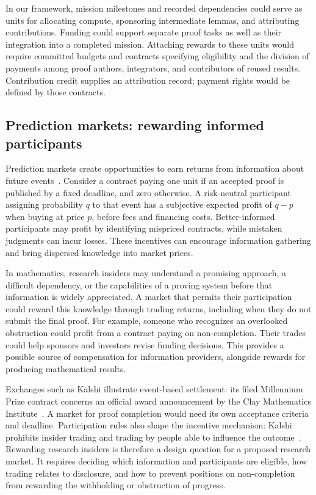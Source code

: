 \documentclass[11pt,a4paper,reqno]{amsart}
\numberwithin{equation}{section}
\begin{document}
In our framework, mission milestones and recorded dependencies could serve as units for allocating compute, sponsoring intermediate lemmas, and attributing contributions. Funding could support separate proof tasks as well as their integration into a completed mission. Attaching rewards to these units would require committed budgets and contracts specifying eligibility and the division of payments among proof authors, integrators, and contributors of reused results. Contribution credit supplies an attribution record; payment rights would be defined by those contracts.

\subsection{Prediction markets: rewarding informed participants}
Prediction markets create opportunities to earn returns from information about future events~\cite{wolfers}. Consider a contract paying one unit if an accepted proof is published by a fixed deadline, and zero otherwise. A risk-neutral participant assigning probability $q$ to that event has a subjective expected profit of $q-p$ when buying at price $p$, before fees and financing costs. Better-informed participants may profit by identifying mispriced contracts, while mistaken judgments can incur losses. These incentives can encourage information gathering and bring dispersed knowledge into market prices.

In mathematics, research insiders may understand a promising approach, a difficult dependency, or the capabilities of a proving system before that information is widely appreciated. A market that permits their participation could reward this knowledge through trading returns, including when they do not submit the final proof. For example, someone who recognizes an overlooked obstruction could profit from a contract paying on non-completion. Their trades could help sponsors and investors revise funding decisions. This provides a possible source of compensation for information providers, alongside rewards for producing mathematical results.

Exchanges such as Kalshi illustrate event-based settlement: its filed Millennium Prize contract concerns an official award announcement by the Clay Mathematics Institute~\cite{kalshi}. A market for proof completion would need its own acceptance criteria and deadline. Participation rules also shape the incentive mechanism: Kalshi prohibits insider trading and trading by people able to influence the outcome~\cite{kalshirules}. Rewarding research insiders is therefore a design question for a proposed research market. It requires deciding which information and participants are eligible, how trading relates to disclosure, and how to prevent positions on non-completion from rewarding the withholding or obstruction of progress.
\end{document}

